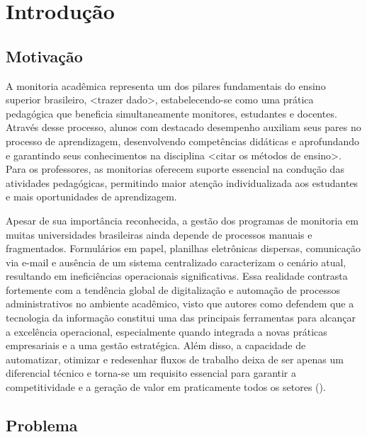 \documentclass[portuguese]{sbc2025}%
\begin{document}
\section{Introdução}
\label{sec:intro}

\subsection{Motivação}
A monitoria acadêmica representa um dos pilares fundamentais do ensino superior brasileiro, <trazer dado>, estabelecendo-se como uma prática pedagógica que beneficia simultaneamente monitores, estudantes e docentes. Através desse processo, alunos com destacado desempenho auxiliam seus pares no processo de aprendizagem, desenvolvendo competências didáticas e aprofundando e garantindo seus conhecimentos na disciplina <citar os métodos de ensino>. Para os professores, as monitorias oferecem suporte essencial na condução das atividades pedagógicas, permitindo maior atenção individualizada aos estudantes e mais oportunidades de aprendizagem. 

Apesar de sua importância reconhecida, a gestão dos programas de monitoria em muitas universidades brasileiras ainda depende de processos manuais e fragmentados. Formulários em papel, planilhas eletrônicas dispersas, comunicação via e-mail e ausência de um sistema centralizado caracterizam o cenário atual, resultando em ineficiências operacionais significativas. Essa realidade contrasta fortemente com a tendência global de digitalização e automação de processos administrativos no ambiente acadêmico, visto que autores como \cite{Laudon_Laudon_2011} defendem que a tecnologia da informação constitui uma das principais ferramentas para alcançar a excelência operacional, especialmente quando integrada a novas práticas empresariais e a uma gestão estratégica. Além disso, a capacidade de automatizar, otimizar e redesenhar fluxos de trabalho deixa de ser apenas um diferencial técnico e torna-se um requisito essencial para garantir a competitividade e a geração de valor em praticamente todos os setores (\cite{Laudon_Laudon_2011}).

\subsection{Problema}
\end{document}
